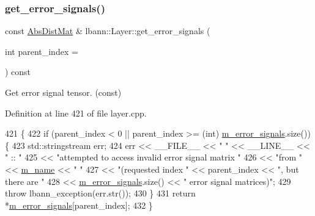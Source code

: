 \subsubsection{\texorpdfstring{get\+\_\+error\+\_\+signals()}{get\_error\_signals()}\hspace{0.1cm}{\footnotesize\ttfamily [2/2]}}
{\footnotesize\ttfamily const \hyperlink{base_8hpp_a9a697a504ae84010e7439ffec862b470}{Abs\+Dist\+Mat} \& lbann\+::\+Layer\+::get\+\_\+error\+\_\+signals (\begin{DoxyParamCaption}\item[{int}]{parent\+\_\+index = {} }\end{DoxyParamCaption}) const}

Get error signal tensor. (const) 

Definition at line 421 of file layer.\+cpp.


\begin{DoxyCode}
421                                                                  \{
422   \textcolor{keywordflow}{if} (parent\_index < 0 || parent\_index >= (\textcolor{keywordtype}{int}) \hyperlink{classlbann_1_1Layer_a452e22ac81c1a799f0614b3e942ea726}{m\_error\_signals}.size()) \{
423     std::stringstream err;
424     err << \_\_FILE\_\_ << \textcolor{stringliteral}{" "} << \_\_LINE\_\_ << \textcolor{stringliteral}{" :: "}
425         << \textcolor{stringliteral}{"attempted to access invalid error signal matrix "}
426         << \textcolor{stringliteral}{"from "} << \hyperlink{classlbann_1_1Layer_aa47109ad09b399142fa92f9d3702189f}{m\_name} << \textcolor{stringliteral}{" "}
427         << \textcolor{stringliteral}{"(requested index "} << parent\_index << \textcolor{stringliteral}{", but there are "}
428         << \hyperlink{classlbann_1_1Layer_a452e22ac81c1a799f0614b3e942ea726}{m\_error\_signals}.size() << \textcolor{stringliteral}{" error signal matrices)"};
429     \textcolor{keywordflow}{throw} lbann\_exception(err.str());
430   \}
431   \textcolor{keywordflow}{return} *\hyperlink{classlbann_1_1Layer_a452e22ac81c1a799f0614b3e942ea726}{m\_error\_signals}[parent\_index];
432 \}
\end{DoxyCode}
\mbox{\label{classlbann_1_1Layer_aaeef8c7631204fc415a94dcdfbcfe93d}} 
